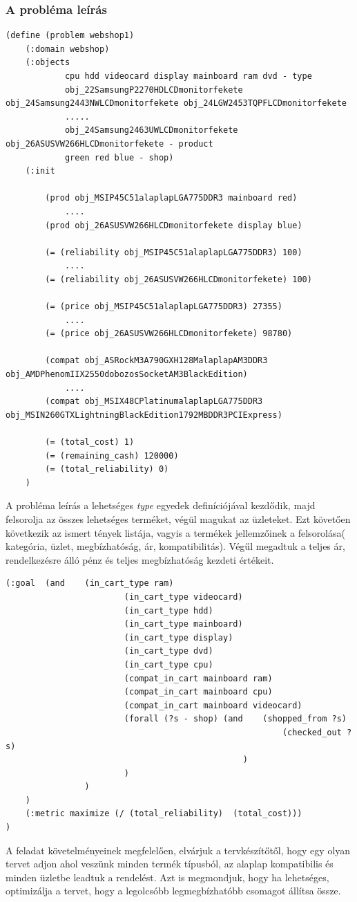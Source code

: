 \subsubsection{A probléma leírás}
\begin{lstlisting}[frame=single]	
(define (problem webshop1)
	(:domain webshop)
	(:objects
			cpu hdd videocard display mainboard ram dvd - type
			obj_22SamsungP2270HDLCDmonitorfekete obj_24Samsung2443NWLCDmonitorfekete obj_24LGW2453TQPFLCDmonitorfekete 
			.....
			obj_24Samsung2463UWLCDmonitorfekete obj_26ASUSVW266HLCDmonitorfekete - product
			green red blue - shop)
	(:init
		
		(prod obj_MSIP45C51alaplapLGA775DDR3 mainboard red)
			....
		(prod obj_26ASUSVW266HLCDmonitorfekete display blue)
		
		(= (reliability obj_MSIP45C51alaplapLGA775DDR3) 100)
			....
		(= (reliability obj_26ASUSVW266HLCDmonitorfekete) 100)
		
		(= (price obj_MSIP45C51alaplapLGA775DDR3) 27355)
			....
		(= (price obj_26ASUSVW266HLCDmonitorfekete) 98780)
		
		(compat obj_ASRockM3A790GXH128MalaplapAM3DDR3 obj_AMDPhenomIIX2550dobozosSocketAM3BlackEdition)
			....
		(compat obj_MSIX48CPlatinumalaplapLGA775DDR3 obj_MSIN260GTXLightningBlackEdition1792MBDDR3PCIExpress)
		
		(= (total_cost) 1)
		(= (remaining_cash) 120000)
		(= (total_reliability) 0)
	)
\end{lstlisting}
A probléma leírás a lehetséges \emph{type} egyedek definíciójával kezdődik, majd felsorolja az összes lehetséges terméket, végül magukat az üzleteket.  Ezt követően következik az ismert tények listája, vagyis a termékek jellemzőinek a felsorolása( kategória, üzlet, megbízhatóság, ár, kompatibilitás). Végűl megadtuk a teljes ár, rendelkezésre álló pénz és teljes megbízhatóság kezdeti értékeit.

\begin{lstlisting}[frame=single]	
	(:goal 	(and	(in_cart_type ram)
						(in_cart_type videocard)
						(in_cart_type hdd)
						(in_cart_type mainboard)
						(in_cart_type display)
						(in_cart_type dvd)
						(in_cart_type cpu)
						(compat_in_cart mainboard ram)
						(compat_in_cart mainboard cpu)
						(compat_in_cart mainboard videocard)
						(forall (?s - shop) (and 	(shopped_from ?s)
														(checked_out ?s)
												)
						)
				)
	)
	(:metric maximize (/ (total_reliability)  (total_cost)))
)
\end{lstlisting}
A feladat követelményeinek megfelelően, elvárjuk a tervkészítőtől, hogy egy olyan tervet adjon ahol veszünk minden termék típusból, az alaplap kompatibilis és minden üzletbe leadtuk a rendelést. Azt is megmondjuk, hogy ha lehetséges, optimizálja a tervet, hogy a legolcsóbb legmegbízhatóbb csomagot állítsa össze.

